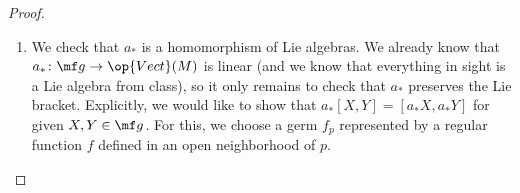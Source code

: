 \documentclass[../notes.tex]{subfiles}
\begin{document}
\begin{proof}
\begin{enumerate}
		
		\item We check that $a_*$ is a homomorphism of Lie algebras. We already know that $a_*\colon\mf g\to\op{Vect}(M)$ is linear (and we know that everything in sight is a Lie algebra from class), so it only remains to check that $a_*$ preserves the Lie bracket. Explicitly, we would like to show that $a_*[X,Y]=[a_*X,a_*Y]$ for given $X,Y\in\mf g$. For this, we choose a germ $f_p$ represented by a regular function $f$ defined in an open neighborhood of $p$. %
		

\end{enumerate}
\end{proof}
\end{document}
